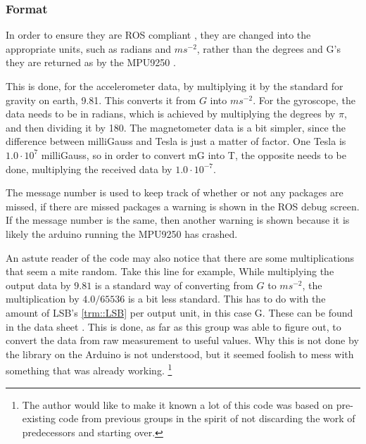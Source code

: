 \subsubsection{Format}
In order to ensure they are ROS compliant \cite{ROSformat}, they are changed into the appropriate units, such as radians and $ms^{-2}$, rather than the degrees and G's they are returned as by the MPU9250 \cite{MPU9250}.

This is done, for the accelerometer data, by multiplying it by the standard for gravity on earth, 9.81.
This converts it from $G$ into $ms^{-2}$.
For the gyroscope, the data needs to be in radians, which is achieved by multiplying the degrees by $\pi$, and then dividing it by 180.
The magnetometer data is a bit simpler, since the difference between milliGauss and Tesla is just a matter of factor.
One Tesla is $1.0 \cdot 10^{7}$ milliGauss, so in order to convert mG into T, the opposite needs to be done, multiplying the received data by  $1.0 \cdot 10^{-7}$.

The message number is used to keep track of whether or not any packages are missed, if there are missed packages a warning is shown in the ROS debug screen.
If the message number is the same, then another warning is shown because it is likely the arduino running the MPU9250 has crashed.

An astute reader of the code may also notice that there are some multiplications that seem a mite random. 
Take this line for example, 
While multiplying the output data by $9.81$ is a standard way of converting from $G$ to $ms^{-2}$, the multiplication by $4.0/65536$ is a bit less standard.
This has to do with the amount of LSB's \ref{trm::LSB} per output unit, in this case G.
These can be found in the data sheet \cite{MPU9250}.
This is done, as far as this group was able to figure out, to convert the data from raw measurement to useful values.
Why this is not done by the library on the Arduino is not understood, but it seemed foolish to mess with something that was already working.
\footnote{The author would like to make it known a lot of this code was based on pre-existing code from previous groups in the spirit of not discarding the work of predecessors and starting over.}
\newpage